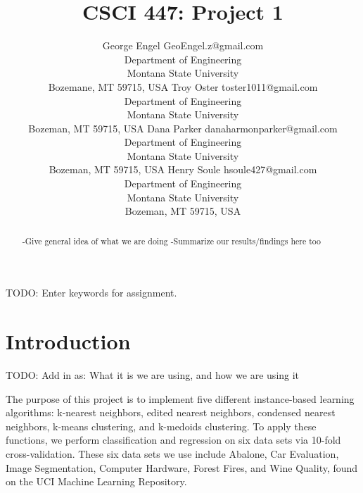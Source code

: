 \documentclass[twoside,11pt]{article}
\begin{document}
\title{CSCI 447: Project 1}

\author{\name George Engel \email GeoEngel.z@gmail.com \\
       \addr Department of Engineering\\
       Montana State University\\
       Bozemane, MT 59715, USA
       \AND
       \name Troy Oster \email toster1011@gmail.com \\
       \addr Department of Engineering\\
       Montana State University\\
       Bozeman, MT 59715, USA
       \AND
       \name Dana Parker \email danaharmonparker@gmail.com \\
       \addr Department of Engineering\\
       Montana State University\\
       Bozeman, MT 59715, USA
       \AND
       \name Henry Soule \email hsoule427@gmail.com \\
       \addr Department of Engineering\\
       Montana State University\\
       Bozeman, MT 59715, USA}


\maketitle

\begin{abstract}%

-Give general idea of what we are doing
-Summarize our results/findings here too

\end{abstract}

\begin{keywords}
    TODO: Enter keywords for assignment.
\end{keywords}

\section{Introduction}
TODO: Add in as: What it is we are using, and how we are using it

The purpose of this project is to implement five different instance-based learning algorithms: k-nearest neighbors, edited nearest neighbors, condensed nearest neighbors, k-means clustering, and k-medoids clustering. To apply these functions, we perform classification and regression on six data sets via 10-fold cross-validation. These six data sets we use include Abalone, Car Evaluation, Image Segmentation, Computer Hardware, Forest Fires, and Wine Quality, found on the UCI Machine Learning Repository.
\end{document}
